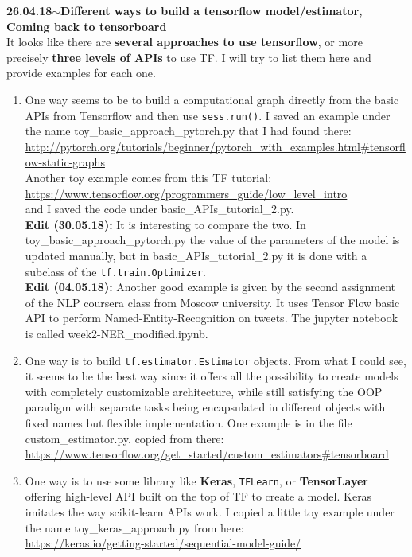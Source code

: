 \documentclass[11pt,a4paper]{article}
\newenvironment{loggentry}[2]%
{\noindent\textbf{#1}\hspace{1cm}$\mathbf{\sim}$\text{ }\textbf{#2}\\}{\vspace{0.5cm}}
\begin{document}
\begin{loggentry}{26.04.18}{Different ways to build a tensorflow model/estimator, Coming back to tensorboard}
It looks like there are \textbf{several approaches to use tensorflow}, or more precisely \textbf{three levels of APIs} to use TF. I will try to list them here and provide examples for each one.
\begin{enumerate}
\item One way seems to be to build a computational graph directly from the basic APIs from Tensorflow and then use \texttt{sess.run()}. I saved an example under the name toy\_basic\_approach\_pytorch.py that I had found there:\\
\url{http://pytorch.org/tutorials/beginner/pytorch_with_examples.html#tensorflow-static-graphs}\\
Another toy example comes from this TF tutorial:\\
\url{https://www.tensorflow.org/programmers_guide/low_level_intro}\\
and I saved the code under basic\_APIs\_tutorial\_2.py.\\
\textbf{Edit (30.05.18):} It is interesting to compare the two. In toy\_basic\_approach\_pytorch.py the value of the parameters of the model is updated manually, but in basic\_APIs\_tutorial\_2.py it is done with a subclass of the \texttt{tf.train.Optimizer}.\\
\textbf{Edit (04.05.18):} Another good example is given by the second assignment of the NLP coursera class from Moscow university. It uses Tensor Flow basic API to perform Named-Entity-Recognition on tweets. The jupyter notebook is called week2-NER\_modified.ipynb.
\item One way is to build \texttt{tf.estimator.Estimator} objects. From what I could see, it seems to be the best way since it offers all the possibility to create models with completely customizable architecture, while still satisfying the OOP paradigm with separate tasks being encapsulated in different objects with fixed names but flexible implementation. One example is in the file custom\_estimator.py. copied from there:\\
\url{https://www.tensorflow.org/get_started/custom_estimators#tensorboard}\\
\item One way is to use some library like \textbf{Keras}, \texttt{TFLearn}, or \textbf{TensorLayer} offering high-level API built on the top of TF to create a model. Keras imitates the way scikit-learn APIs work. I copied a little toy example under the name toy\_keras\_approach.py from here:\\
\url{https://keras.io/getting-started/sequential-model-guide/}
\end{enumerate}
\end{loggentry}
\end{document}
